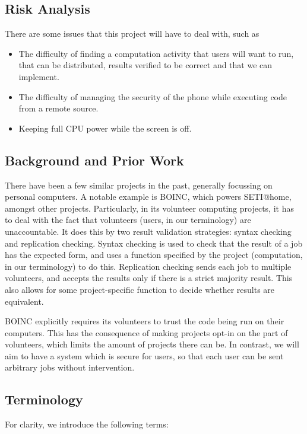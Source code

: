 \documentclass[a4paper,10pt]{article}
\begin{document}
\subsection{Risk Analysis}
There are some issues that this project will have to deal with, such as
\begin{itemize}
 \item The difficulty of finding a computation activity that users will want to run, that can be distributed, results verified to be correct and that we can implement.
 \item The difficulty of managing the security of the phone while executing code from a remote source.
 \item Keeping full CPU power while the screen is off.
\end{itemize}


\subsection{Background and Prior Work}
There have been a few similar projects in the past, generally focussing on personal computers. A notable example is BOINC, which powers SETI@home, amongst other projects. Particularly, in its volunteer computing projects, it has to deal with the fact that volunteers (users, in our terminology) are unaccountable. It does this by two result validation strategies: syntax checking and replication checking. Syntax checking is used to check that the result of a job has the expected form, and uses a function specified by the project (computation, in our terminology) to do this. Replication checking sends each job to multiple volunteers, and accepts the results only if there is a strict majority result. This also allows for some project-specific function to decide whether results are equivalent.

BOINC explicitly requires its volunteers to trust the code being run on their computers. This has the consequence of making projects opt-in on the part of volunteers, which limits the amount of projects there can be. In contrast, we will aim to have a system which is secure for users, so that each user can be sent arbitrary jobs without intervention.

\subsection{Terminology}
For clarity, we introduce the following terms:
\end{document}
